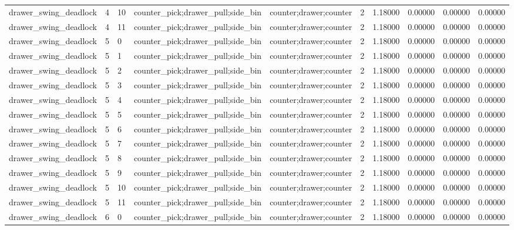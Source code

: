 \documentclass{article}
\begin{document}
\begin{table}[tbp]
{\begin{tabular}{llllllllll}
drawer\_swing\_deadlock & 4 & 10 & counter\_pick;drawer\_pull;side\_bin & counter;drawer;counter & 2 & 1.18000 & 0.00000 & 0.00000 & 0.00000 \\
drawer\_swing\_deadlock & 4 & 11 & counter\_pick;drawer\_pull;side\_bin & counter;drawer;counter & 2 & 1.18000 & 0.00000 & 0.00000 & 0.00000 \\
drawer\_swing\_deadlock & 5 & 0 & counter\_pick;drawer\_pull;side\_bin & counter;drawer;counter & 2 & 1.18000 & 0.00000 & 0.00000 & 0.00000 \\
drawer\_swing\_deadlock & 5 & 1 & counter\_pick;drawer\_pull;side\_bin & counter;drawer;counter & 2 & 1.18000 & 0.00000 & 0.00000 & 0.00000 \\
drawer\_swing\_deadlock & 5 & 2 & counter\_pick;drawer\_pull;side\_bin & counter;drawer;counter & 2 & 1.18000 & 0.00000 & 0.00000 & 0.00000 \\
drawer\_swing\_deadlock & 5 & 3 & counter\_pick;drawer\_pull;side\_bin & counter;drawer;counter & 2 & 1.18000 & 0.00000 & 0.00000 & 0.00000 \\
drawer\_swing\_deadlock & 5 & 4 & counter\_pick;drawer\_pull;side\_bin & counter;drawer;counter & 2 & 1.18000 & 0.00000 & 0.00000 & 0.00000 \\
drawer\_swing\_deadlock & 5 & 5 & counter\_pick;drawer\_pull;side\_bin & counter;drawer;counter & 2 & 1.18000 & 0.00000 & 0.00000 & 0.00000 \\
drawer\_swing\_deadlock & 5 & 6 & counter\_pick;drawer\_pull;side\_bin & counter;drawer;counter & 2 & 1.18000 & 0.00000 & 0.00000 & 0.00000 \\
drawer\_swing\_deadlock & 5 & 7 & counter\_pick;drawer\_pull;side\_bin & counter;drawer;counter & 2 & 1.18000 & 0.00000 & 0.00000 & 0.00000 \\
drawer\_swing\_deadlock & 5 & 8 & counter\_pick;drawer\_pull;side\_bin & counter;drawer;counter & 2 & 1.18000 & 0.00000 & 0.00000 & 0.00000 \\
drawer\_swing\_deadlock & 5 & 9 & counter\_pick;drawer\_pull;side\_bin & counter;drawer;counter & 2 & 1.18000 & 0.00000 & 0.00000 & 0.00000 \\
drawer\_swing\_deadlock & 5 & 10 & counter\_pick;drawer\_pull;side\_bin & counter;drawer;counter & 2 & 1.18000 & 0.00000 & 0.00000 & 0.00000 \\
drawer\_swing\_deadlock & 5 & 11 & counter\_pick;drawer\_pull;side\_bin & counter;drawer;counter & 2 & 1.18000 & 0.00000 & 0.00000 & 0.00000 \\
drawer\_swing\_deadlock & 6 & 0 & counter\_pick;drawer\_pull;side\_bin & counter;drawer;counter & 2 & 1.18000 & 0.00000 & 0.00000 & 0.00000 \\

\end{tabular}}
\end{table}
\end{document}
